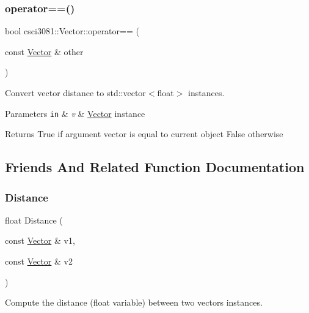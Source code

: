 \subsubsection{\texorpdfstring{operator==()}{operator==()}}
{\footnotesize\ttfamily bool csci3081\+::\+Vector\+::operator== (\begin{DoxyParamCaption}\item[{const \hyperlink{classcsci3081_1_1Vector}{Vector} \&}]{other }\end{DoxyParamCaption})}



Convert vector distance to std\+::vector$<$float$>$ instances. 


\begin{DoxyParams}[1]{Parameters}
\mbox{\tt in}  & {\em v} & \hyperlink{classcsci3081_1_1Vector}{Vector} instance \\
\hline
\end{DoxyParams}
\begin{DoxyReturn}{Returns}
True if argument vector is equal to current object False otherwise 
\end{DoxyReturn}


\subsection{Friends And Related Function Documentation}
\mbox{\label{classcsci3081_1_1Vector_acd23c5473c105b42b0656eaa0ffa02d2}} 
\subsubsection{\texorpdfstring{Distance}{Distance}}
{\footnotesize\ttfamily float Distance (\begin{DoxyParamCaption}\item[{const \hyperlink{classcsci3081_1_1Vector}{Vector} \&}]{v1,  }\item[{const \hyperlink{classcsci3081_1_1Vector}{Vector} \&}]{v2 }\end{DoxyParamCaption})\hspace{0.3cm}{\ttfamily [friend]}}



Compute the distance (float variable) between two vectors instances. 


